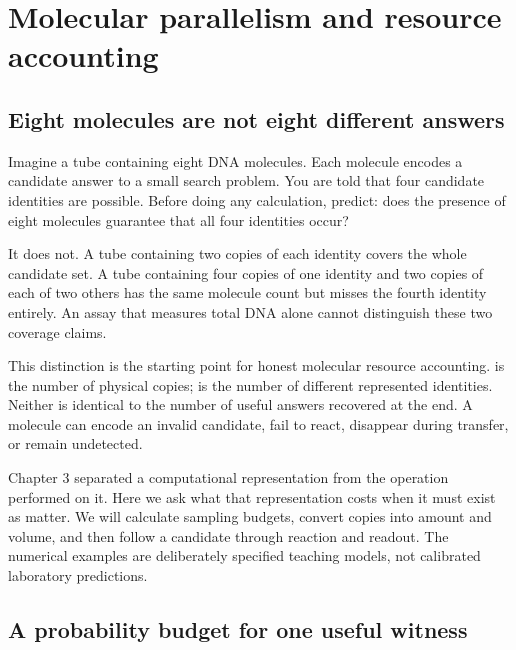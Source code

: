 \chapter{Molecular parallelism and resource accounting}
\label{ch:resources}

\section{Eight molecules are not eight different answers}

Imagine a tube containing eight DNA molecules. Each molecule encodes a candidate answer to a small search problem. You are told that four candidate identities are possible. Before doing any calculation, predict: does the presence of eight molecules guarantee that all four identities occur?

It does not. A tube containing two copies of each identity covers the whole candidate set. A tube containing four copies of one identity and two copies of each of two others has the same molecule count but misses the fourth identity entirely. An assay that measures total DNA alone cannot distinguish these two coverage claims.


This distinction is the starting point for honest molecular resource accounting.  is the number of physical copies;  is the number of different represented identities. Neither is identical to the number of useful answers recovered at the end. A molecule can encode an invalid candidate, fail to react, disappear during transfer, or remain undetected.

Chapter 3 separated a computational representation from the operation performed on it. Here we ask what that representation costs when it must exist as matter. We will calculate sampling budgets, convert copies into amount and volume, and then follow a candidate through reaction and readout. The numerical examples are deliberately specified teaching models, not calibrated laboratory predictions.

\section{A probability budget for one useful witness}

